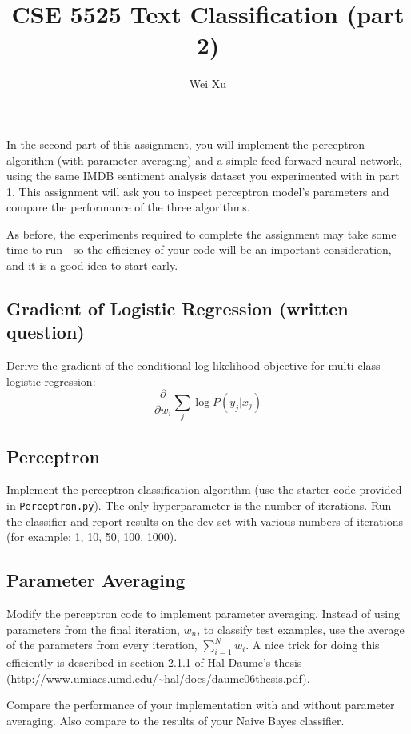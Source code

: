 \documentclass[12pt, letterpaper]{article}
\begin{document}
\title{CSE 5525 Text Classification (part 2)}
\author{Wei Xu}
\date{}
\maketitle

In the second part of this assignment, you will implement the perceptron algorithm (with parameter averaging) and a simple feed-forward neural network, using the same IMDB sentiment analysis dataset you experimented with in part 1.  This assignment will ask you to inspect perceptron model's parameters and compare the performance of the three algorithms.

As before, the experiments required to complete the assignment may take some time to run - so the efficiency of your code will be an important consideration, and it is a good idea to start early.

\subsection*{Gradient of Logistic Regression (written question)}
Derive the gradient of the conditional log likelihood objective for multi-class logistic regression:
\begin{equation}
\frac{\partial}{\partial w_i} \sum_{j} \log P(y_j|x_j)
\end{equation}

\newpage
\subsection*{Perceptron}
Implement the perceptron classification algorithm (use the starter code provided in {\tt Perceptron.py}).
The only hyperparameter is the number of iterations.  Run the classifier and report results on the dev set with
various numbers of iterations (for example: 1, 10, 50, 100, 1000).

\subsection*{Parameter Averaging}
Modify the perceptron code to implement parameter averaging.  Instead of using parameters from the final iteration, $w_n$, to classify test examples, 
use the average of the parameters from every iteration, $\sum_{i=1}^N w_i$.  A nice trick for doing this efficiently is described in section 2.1.1 of Hal Daume's thesis
(\url{http://www.umiacs.umd.edu/~hal/docs/daume06thesis.pdf}).

Compare the performance of your implementation with and without parameter averaging.  Also compare to the results of your Naive Bayes classifier.
\end{document}
